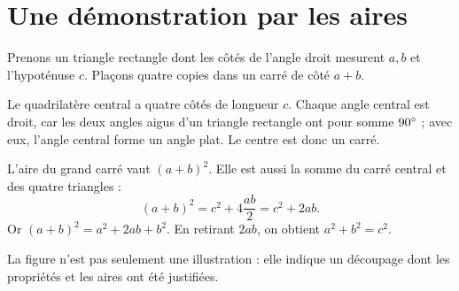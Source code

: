 \documentclass[../cours_3e.tex]{subfiles}
\begin{document}
\section{Une démonstration par les aires}
Prenons un triangle rectangle dont les côtés de l'angle droit mesurent $a,b$ et l'hypoténuse $c$. Plaçons quatre copies dans un carré de côté $a+b$.
\begin{center}
\end{center}
\begin{demonstration}
Le quadrilatère central a quatre côtés de longueur $c$. Chaque angle central est droit, car les deux angles aigus d'un triangle rectangle ont pour somme $90^{\circ}$ ; avec eux, l'angle central forme un angle plat. Le centre est donc un carré.

L'aire du grand carré vaut $(a+b)^2$. Elle est aussi la somme du carré central et des quatre triangles :
\[(a+b)^2=c^2+4\frac{ab}{2}=c^2+2ab.\]
Or $(a+b)^2=a^2+2ab+b^2$. En retirant $2ab$, on obtient $a^2+b^2=c^2$.
\end{demonstration}
La figure n'est pas seulement une illustration : elle indique un découpage dont les propriétés et les aires ont été justifiées.
\end{document}
